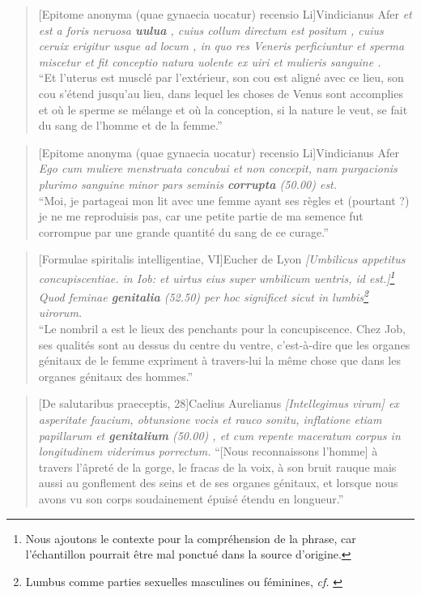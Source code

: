 \begin{quote}[Epitome anonyma (quae gynaecia uocatur) recensio Li]{Vindicianus Afer}
    \textit{et est a foris neruosa \textbf{uulua} , cuius collum directum est positum , cuius ceruix erigitur usque ad locum , in quo res Veneris perficiuntur et sperma miscetur et fit conceptio natura uolente ex uiri et mulieris sanguine .} \\
    \enquote{Et l'uterus est musclé par l'extérieur, son cou est aligné avec ce lieu, son cou s'étend jusqu'au lieu, dans lequel les choses de Venus sont accomplies et où le sperme se mélange et où la conception, si la nature le veut, se fait du sang de l'homme et de la femme.}
\end{quote}

\begin{quote}[Epitome anonyma (quae gynaecia uocatur) recensio Li]{Vindicianus Afer}
    \textit{Ego cum muliere menstruata concubui et non concepit, nam purgacionis plurimo sanguine minor pars seminis \textbf{corrupta} (50.00) est.} \\
    \enquote{Moi, je partageai mon lit avec une femme ayant ses règles et (pourtant ?) je ne me reproduisis pas, car une petite partie de ma semence fut corrompue par une grande quantité du sang de ce curage.}
\end{quote}

\begin{quote}[Formulae spiritalis intelligentiae, VI]{Eucher de Lyon}
    \textit{{[}Umbilicus appetitus concupiscentiae. in Iob: et uirtus eius super umbilicum uentris, id est.{]}\footnote{Nous ajoutons le contexte pour la compréhension de la phrase, car l'échantillon pourrait être mal ponctué dans la source d'origine.} Quod feminae \textbf{genitalia} (52.50) per hoc significet sicut in lumbis\footnote{Lumbus comme parties sexuelles masculines ou féminines, \textit{cf.} \cite[p.48]{Adams}} uirorum.} \\
    \enquote{Le nombril a est le lieux des penchants pour la concupiscence. Chez Job, ses qualités sont au dessus du centre du ventre, c'est-à-dire que les organes génitaux de le femme expriment à travers-lui la même chose que dans les organes génitaux des hommes.}
\end{quote}

\begin{quote}[De salutaribus praeceptis, 28]{Caelius Aurelianus}
    \textit{{[}Intellegimus virum{]} ex asperitate faucium, obtunsione vocis et rauco sonitu, inflatione etiam papillarum et \textbf{genitalium} (50.00) , et cum repente maceratum corpus in longitudinem viderimus porrectum.}
    \enquote{{[}Nous reconnaissons l'homme{]} à travers l'âpreté de la gorge, le fracas de la voix, à son bruit rauque mais aussi au gonflement des seins et de ses organes génitaux, et lorsque nous avons vu son corps soudainement épuisé étendu en longueur.}
\end{quote}

